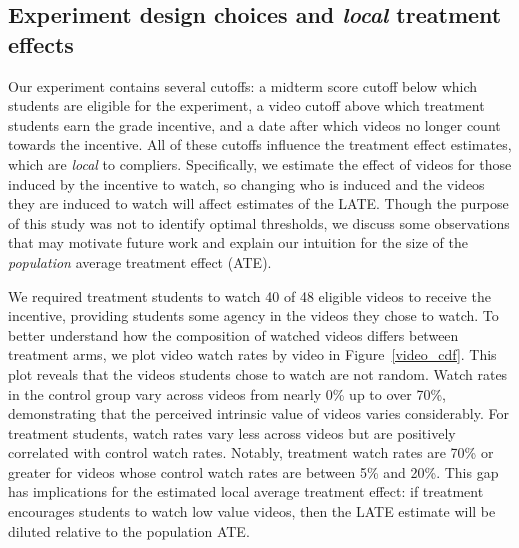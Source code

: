 \documentclass[12pt]{article}
\begin{document}
\subsection{Experiment design choices and \textit{local} treatment effects} \label{subsec:lates_section}

Our experiment contains several cutoffs: a midterm score cutoff below which students are eligible for the experiment, a video cutoff above which treatment students earn the grade incentive, and a date after which videos no longer count towards the incentive.
All of these cutoffs influence the treatment effect estimates, which are \textit{local} to compliers.
Specifically, we estimate the effect of videos for those induced by the incentive to watch, so changing who is induced and the videos they are induced to watch will affect estimates of the LATE. Though the purpose of this study was not to identify optimal thresholds, we discuss some observations that may motivate future work and explain our intuition for the size of the \textit{population} average treatment effect (ATE).

We required treatment students to watch 40 of 48 eligible videos to receive the incentive, providing students some agency in the videos they chose to watch.
To better understand how the composition of watched videos differs between treatment arms, we plot video watch rates by video in Figure~\ref{video_cdf}.
This plot reveals that the videos students chose to watch are not random.
Watch rates in the control group vary across videos from nearly 0\% up to over 70\%, demonstrating that the perceived intrinsic value of videos varies considerably.
For treatment students, watch rates vary less across videos but are positively correlated with control watch rates.
Notably, treatment watch rates are 70\% or greater for videos whose control watch rates are between 5\% and 20\%.
This gap has implications for the estimated local average treatment effect: if treatment encourages students to watch low value videos, then the LATE estimate will be diluted relative to the population ATE.
\end{document}
